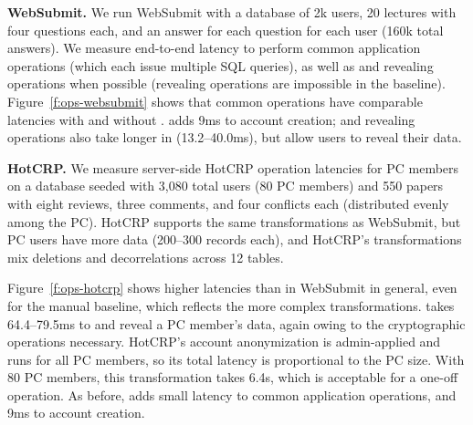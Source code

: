 \textbf{WebSubmit.}
%
We run WebSubmit with a database of 2k users, 20 lectures with four questions
each, and an answer for each question for each user (160k total answers).
%
We measure end-to-end latency to perform common application operations (which
each issue multiple SQL queries), as well as \xxing and revealing operations
when possible (revealing operations are impossible in the baseline).
%
%
%
Figure~\ref{f:ops-websubmit} shows that common operations have comparable
latencies with and without \sys.
%
\sys adds 9ms to account creation; \xxing and revealing operations also take
longer in \sys (13.2--40.0ms), but allow users to reveal their data.
%

\textbf{HotCRP.}
%
We measure server-side HotCRP operation latencies for PC members on a database seeded with 3,080
total users (80 PC members)
and 550 papers with eight reviews, three comments, and four conflicts each
(distributed evenly among the PC).
%
HotCRP supports the same \xxing transformations as WebSubmit, but PC users have more
data (200--300 records each), and HotCRP's \xxing transformations mix deletions and
decorrelations across 12 tables. %
%

%
Figure~\ref{f:ops-hotcrp} shows higher latencies than in WebSubmit in general, even for the manual
baseline, which reflects the more complex \xxing transformations.
%
\sys takes 64.4--79.5ms to \xx and reveal a PC member's data, again owing to the
cryptographic operations necessary.
%
HotCRP's account anonymization is admin-applied and runs for all PC members, so
its total latency is proportional to the PC size.
%
With 80 PC members, this transformation takes 6.4s, which is acceptable for a
one-off operation.
%
As before, \sys adds small latency to common application operations, and 9ms to
account creation.
%

